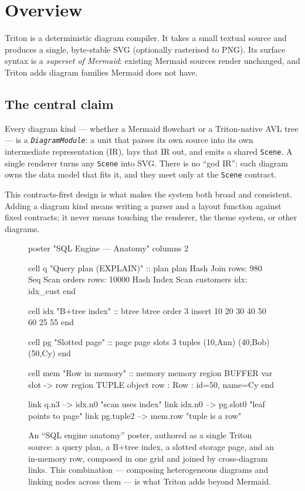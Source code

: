 \section{Overview}
\label{sec:overview}

Triton is a deterministic diagram compiler. It takes a small textual source and
produces a single, byte-stable SVG (optionally rasterised to PNG). Its surface
syntax is a \emph{superset of Mermaid}: existing Mermaid sources render
unchanged, and Triton adds diagram families Mermaid does not have.

\subsection{The central claim}

Every diagram kind --- whether a Mermaid flowchart or a Triton-native AVL tree
--- is a \emph{\texttt{DiagramModule}}: a unit that parses its own source into
its own intermediate representation (IR), lays that IR out, and emits a shared
\texttt{Scene}. A single renderer turns any \texttt{Scene} into SVG. There is no
``god IR'': each diagram owns the data model that fits it, and they meet only at
the \texttt{Scene} contract.

This contracts-first design is what makes the system both broad and consistent.
Adding a diagram kind means writing a parser and a layout function against fixed
contracts; it never means touching the renderer, the theme system, or other
diagrams.

\begin{figure}[htbp]
  \centering
\begin{triton}
poster "SQL Engine — Anatomy"
    columns 2

    cell q "Query plan (EXPLAIN)" :: plan
        plan
            Hash Join {rows: 980}
                Seq Scan orders {rows: 10000}
                Hash
                    Index Scan customers {idx: idx_cust}
    end

    cell idx "B+tree index" :: btree
        btree order 3 insert 10 20 30 40 50 60 25 55
    end

    cell pg "Slotted page" :: page
        page
            slots 3
            tuples (10,Ann) (40,Bob) (50,Cy)
    end

    cell mem "Row in memory" :: memory
        memory
            region BUFFER
                var slot -> row
            region TUPLE
                object row : Row : id=50, name=Cy
    end

    link q.n3 --> idx.n0 "scan uses index"
    link idx.n0 --> pg.slot0 "leaf points to page"
    link pg.tuple2 --> mem.row "tuple is a row"
\end{triton}
  \caption{An ``SQL engine anatomy'' poster, authored as a single Triton
source: a query plan, a B+tree index, a slotted storage page, and an in-memory
row, composed in one grid and joined by cross-diagram links. This combination ---
composing heterogeneous diagrams and linking nodes across them --- is what Triton
adds beyond Mermaid.}
\end{figure}

